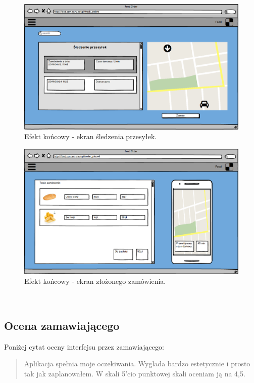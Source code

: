 \begin{figure}[H]
\centering
\includegraphics[width=15cm]{pictures/sledzenie_przesylek_v1.png}
\caption{Efekt końcowy - ekran śledzenia przesyłek.}
\end{figure}

\begin{figure}[H]
\centering
\includegraphics[width=15cm]{pictures/Zamowienie_zlozone_v3.png}
\caption{Efekt końcowy - ekran złożonego zamówienia.}
\end{figure}

\subsection{Ocena zamawiającego}
Poniżej cytat oceny interfejsu przez zamawiającego:
\begin{quote}
Aplikacja spełnia moje oczekiwania. Wyglada bardzo estetycznie i prosto tak jak zaplanowałem. W skali 5'cio punktowej skali oceniam ją na 4,5. 
\end{quote}
